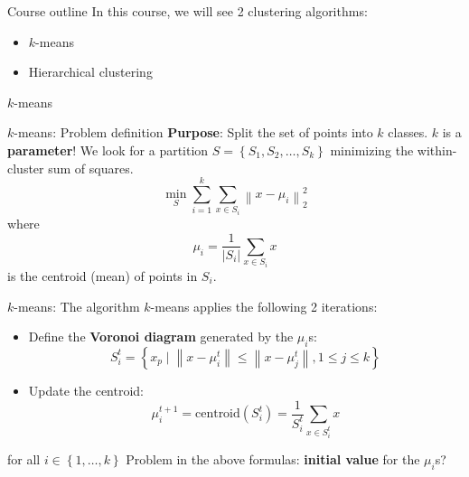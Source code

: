 \documentclass{beamer}
\newcommand{\norm}[1]{\left\lVert#1\right\rVert}
\begin{document}
\begin{frame}{Course outline}
In this course, we will see 2 clustering algorithms:
\pause
\begin{itemize}
	\item $k$-means
	\item Hierarchical clustering
\end{itemize}
\end{frame}

\begin{frame}
	\center \Huge{$k$-means}
\end{frame}

\begin{frame}{$k$-means: Problem definition}
\textbf{Purpose}: Split the set of points into $k$ classes. $k$ is a \textbf{parameter}!
\pause
\vfill
We look for a partition $S = \left\{ S_1, S_2, \dots, S_k\right\}$ minimizing the within-cluster sum of squares.
\begin{equation*}
\min_S \sum_{i = 1}^{k} \sum_{x \in S_i} \norm{x - \mu_i}_2^2
\end{equation*}
\pause
where 
\begin{equation*}
\mu_i = \dfrac{1}{|S_i|} \sum_{x \in S_i} x
\end{equation*}
is the centroid (mean) of points in $S_i$.
\end{frame}

\begin{frame}{$k$-means: The algorithm}
$k$-means applies the following 2 iterations:
\pause
\begin{itemize}
	\item Define the \textbf{Voronoi diagram} generated by the $\mu_i$s:
	\begin{equation*}
		S_i^t = \left\{ x_p \mid \norm{x - \mu_i^t} \leq \norm{x - \mu_j^t}, 1 \leq j \leq k \right\}
	\end{equation*}
	\pause
	\item Update the centroid:
	\begin{equation*}
		\mu_i^{t+1} = \text{centroid}(S_i^t) = \dfrac{1}{S_i^t} \sum_{x \in S_i^t} x
	\end{equation*}
\end{itemize}
for all $i \in \left\{ 1, \dots, k\right\}$
\vfill
\pause
Problem in the above formulas: \textbf{initial value} for the $\mu_i$s?
\end{frame}
\end{document}
